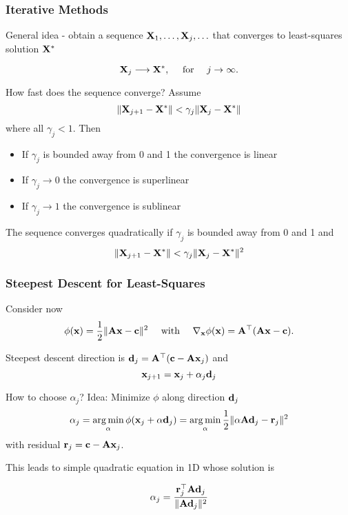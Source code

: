 \documentclass[12pt,fleqn,handout]{beamer}
\begin{document}
\begin{frame}\frametitle{Iterative Methods}


General idea - obtain a sequence ${\bf X}_1, \ldots,{\bf X}_j,\ldots$
that converges to least-squares solution ${\bf X}^*$

$$
	{\bf X}_j \longrightarrow {\bf X}^*, \quad \text{ for } \quad j \to \infty.
$$

\bigskip

How fast does the sequence converge? Assume
$$
\|{\bf X}_{j+1} - {\bf X}^* \| < \gamma_j \|{\bf X}_{j} - {\bf X}^* \|
$$ 
where all $\gamma_j < 1$. Then

\begin{itemize}
\item If $\gamma_j$ is bounded away from $0$ and 1 the convergence is linear
\item If $\gamma_j \rightarrow 0$ the convergence is superlinear
\item If $\gamma_j \rightarrow 1$ the convergence is sublinear
\end{itemize}

The sequence converges quadratically if $\gamma_j$ is bounded away from 0 and 1 and 
$$ \|{\bf X}_{j+1} - {\bf X}^* \| < \gamma_j \|{\bf X}_{j} - {\bf X}^* \|^2 $$ 
\end{frame}



\begin{frame}\frametitle{Steepest Descent for Least-Squares}

Consider now
$$ \phi({\bf x}) = {\frac 12} \|{\bf A} {\bf x} - {\bf c}\|^2 \quad \text{ with } \quad \nabla_{{\bf x}} \phi({\bf x}) = {\bf A}^{\top}({\bf A} {\bf x} -  {\bf c}).$$

\bigskip

Steepest descent direction is  ${\bf d}_j = {\bf A}^{\top}({\bf c} - {\bf A} {\bf x}_j)$ and
$$ {\bf x}_{j+1} = {\bf x}_j + \alpha_j {\bf d}_j $$

How to choose $\alpha_j$? 
\pause
Idea: Minimize $\phi$ along direction ${\bf d}_j$
$$ 
\alpha_j = \operatorname*{arg\,min}_\alpha \phi({\bf x}_j + \alpha {\bf d}_j) = 
 \operatorname*{arg\,min}_\alpha {\frac 12} \|\alpha {\bf A} {\bf d}_j - {\bf r}_j\|^2
$$
with residual ${\bf r}_j = {\bf c} - {\bf A} {\bf x}_j $.

\bigskip
\pause

This leads to simple quadratic equation in 1D whose solution is
 
  
$$ \alpha_j = {\frac { {\bf r}_j^{\top}{\bf A}{\bf d}_j}{\|{\bf A} {\bf d}_j\|^2}} $$


\end{frame}
\end{document}
